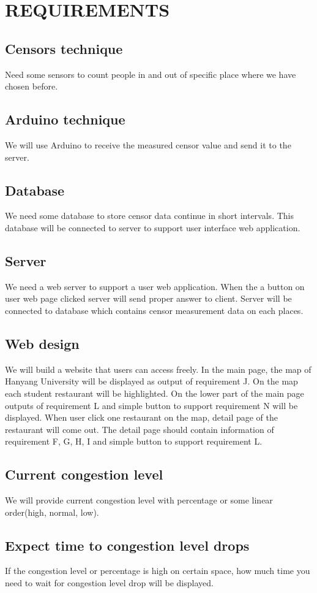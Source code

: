 \documentclass[journal]{IEEEtran}
\begin{document}
\section{REQUIREMENTS}

\subsection{Censors technique}
Need some sensors to count people in and out of specific place where we have chosen before.
\subsection{Arduino technique}
We will use Arduino to receive the measured censor value and send it to the server.
\subsection{Database}
We need some database to store censor data continue in short intervals. This database will be connected to server to support user interface web application.
\subsection{Server}
We need a web server to support a user web application. When the a button on user web page clicked server will send proper answer to client. Server will be connected to database which contains censor measurement data on each places.
\subsection{Web design}
We will build a website that users can access freely. 
 In the main page, the map of Hanyang University will be displayed as output of requirement J. On the map each student restaurant will be highlighted. On the lower part of the main page outputs of requirement L and simple button to support requirement N will be displayed. When user click one restaurant on the map, detail page of the restaurant will come out. The detail page should contain information of requirement F, G, H, I and simple button to support requirement L. 

\subsection{Current congestion level }
We will provide current congestion level with percentage or some linear order(high, normal, low).
\subsection{Expect time to congestion level drops}
If the congestion level or percentage is high on certain space, how much time you need to wait for congestion level drop will be displayed.
\end{document}

